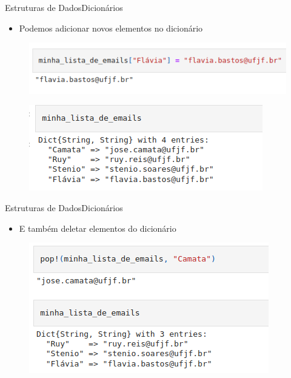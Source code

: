 \documentclass{beamer}
\begin{document}
\begin{frame}{Estruturas de Dados}{Dicionários}
    \begin{itemize}
        \item Podemos adicionar novos elementos no dicionário
    \end{itemize}
    \begin{figure}
        \centering
        \includegraphics[scale=0.4]{imagens/dicionario03.png}
        \label{fig:my_label}
    \end{figure}
    \begin{figure}
        \centering
        \includegraphics[scale=0.4]{imagens/dicionario04.png}
        \label{fig:my_label}
    \end{figure}
\end{frame}

\begin{frame}{Estruturas de Dados}{Dicionários}
    \begin{itemize}
        \item E também deletar elementos do dicionário
    \end{itemize}
    \begin{figure}
        \centering
        \includegraphics[scale=0.5]{imagens/dicionario05.png}
        \label{fig:my_label}
    \end{figure}
\end{frame}
\end{document}
